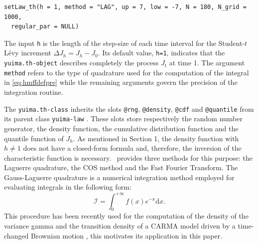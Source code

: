 \begin{verbatim}
setLaw_th(h = 1, method = "LAG", up = 7, low = -7, N = 180, N_grid = 1000,
  regular_par = NULL)
\end{verbatim}

The input \texttt{h} is the length of the step-size of each time interval for the Student-\(t\) Lévy increment \(\Delta J_h=J_h-J_0\). Its default value, \texttt{h=1}, indicates that the \texttt{yuima.th-object} describes completely the process \(J_t\) at time 1. The argument \texttt{method} refers to the type of quadrature used for the computation of the integral in \eqref{eq:hmffdefpre} while the remaining arguments govern the precision of the integration routine.

The \texttt{yuima.th-class} inherits the slots \texttt{@rng}, \texttt{@density}, \texttt{@cdf} and \texttt{@quantile} from its parent class \texttt{yuima-law} \citet{Masuda2022}. These slots store respectively the random number generator, the density function, the cumulative distribution function and the quantile function of \(J_h\). \newline  As mentioned in Section 1, the density function with \(h\neq1\) does not have a closed-form formula and, therefore, the inversion of the characteristic function is necessary.  ~provides three methods for this purpose: the Laguerre quadrature, the COS method and the Fast Fourier Transform.
The Gauss-Laguerre quadrature is a numerical integration method employed for evaluating integrals in the following form:
\[
\mathcal{I}=\int_0^{+\infty} f\left(x\right) e^{-x}\mbox{d}x.
\]
This procedure has been recently used for the computation of the density of the variance gamma and the transition density of a CARMA model driven by a time-changed Brownian motion \citep{loregian2012approximation, mercuri2021finite}, this motivates its application in this paper.

